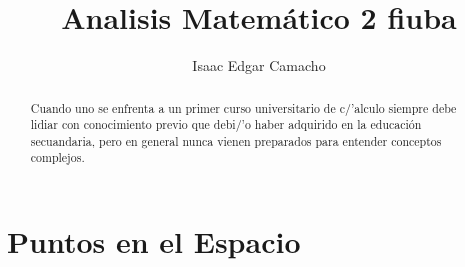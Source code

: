 \documentclass[a4paper,12pt]{article}
\title{Analisis Matem\'atico 2 fiuba}
\author{Isaac Edgar Camacho}
\begin{document}
\maketitle

\begin{abstract}
Cuando uno se enfrenta a un primer curso universitario de c/'alculo siempre debe lidiar con conocimiento previo que debi/'o haber adquirido en la educaci\'on secuandaria, pero en general nunca vienen preparados para entender conceptos complejos.

\end{abstract}

\tableofcontents

\section{Puntos en el Espacio}
\end{document}
